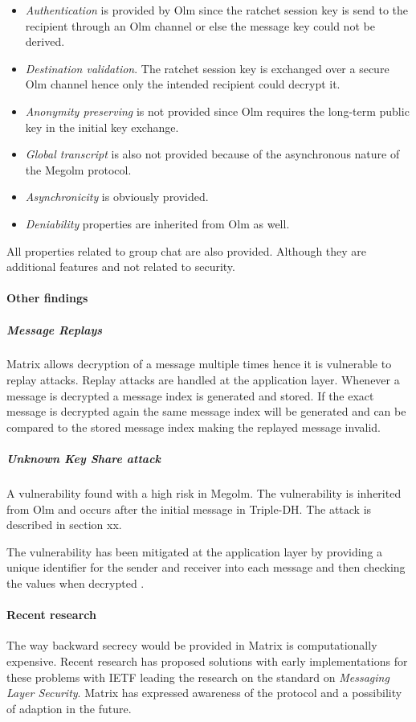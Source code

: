 \begin{itemize}
	
	\item \emph{Authentication} is provided by Olm since the ratchet session key is send to the recipient through an Olm channel or else the message key could not be derived.
	\item \emph{Destination validation}. The ratchet session key is exchanged over a secure Olm channel hence only the intended recipient could decrypt it.
	\item \emph{Anonymity preserving} is not provided since Olm requires the long-term public key in the initial key exchange.
	\item \emph{Global transcript} is also not provided because of the asynchronous nature of the Megolm protocol.  
	\item \emph{Asynchronicity} is obviously provided.
	\item \emph{Deniability} properties are inherited from Olm as well.
\end{itemize}

All properties related to group chat are also provided. Although they are additional features and not related to security. 


\paragraph{Other findings}

\subparagraph{Message Replays}

Matrix allows decryption of a message multiple times hence it is vulnerable to replay attacks. Replay attacks are handled at the application layer. Whenever a message is decrypted a message index is generated and stored. If the exact message is decrypted again the same message index will be generated and can be compared to the stored message index making the replayed message invalid. 

\subparagraph{Unknown Key Share attack}

A vulnerability found with a high risk in Megolm. The vulnerability is inherited from Olm and occurs after the initial message in Triple-DH. The attack is described in section xx.

The vulnerability has been mitigated at the application layer by providing a unique identifier for the sender and receiver into each message and then checking the values when decrypted \cite{ncc}.

\paragraph{Recent research}
The way backward secrecy would be provided in Matrix is computationally expensive. Recent research has proposed solutions with early implementations for these problems with IETF leading the research on the standard on \emph{Messaging Layer Security}. Matrix has expressed awareness of the protocol and a possibility of adaption in the future.

